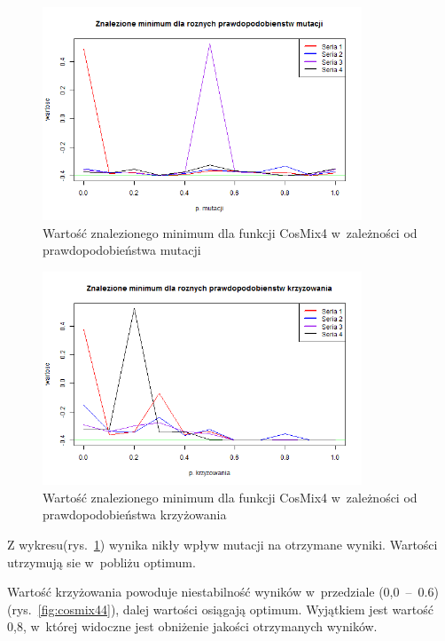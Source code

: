 \documentclass[11pt, a4paper]{article}
\newcommand{\fbi}{\leavevmode{\parindent=1em\indent}}
\begin{document}
\begin{figure}[H]
	\begin{center}
		\includegraphics[width=0.85\textwidth]{./assets/CosMix42.png}
		\caption{Wartość znalezionego minimum dla funkcji CosMix4 w~zależności od prawdopodobieństwa mutacji}
		\label{fig:cosmix42}
	\end{center}
\end{figure}

\begin{figure}[H]
	\begin{center}
		\includegraphics[width=0.85\textwidth]{./assets/CosMix43.png}
		\caption{Wartość znalezionego minimum dla funkcji CosMix4 w~zależności od prawdopodobieństwa krzyżowania}
		\label{fig:cosmix43}
	\end{center}
\end{figure}

\fbi
Z wykresu(rys.~\ref{fig:cosmix42}) wynika nikły wpływ mutacji na otrzymane wyniki. Wartości utrzymują sie w~pobliżu optimum.

\fbi
Wartość krzyżowania powoduje niestabilność wyników w~przedziale (0,0~--~0.6)(rys.~\ref{fig:cosmix44}), dalej wartości osiągają optimum. Wyjątkiem jest wartość 0,8, w~której widoczne jest obniżenie jakości otrzymanych wyników.
\end{document}
